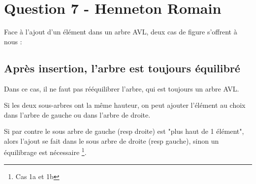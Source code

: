 \documentclass[10pt,a4paper]{article}
\begin{document}
\newpage
\section*{Question 7 - Henneton Romain}
Face à l'ajout d'un élément dans un arbre AVL, deux cas de figure s'offrent à nous :
\subsection*{Après insertion, l'arbre est toujours équilibré}
Dans ce cas, il ne faut pas rééquilibrer l'arbre, qui est toujours un arbre AVL. 

Si les deux sous-arbres ont la même hauteur, on peut ajouter l'élément au choix dans l'arbre de gauche ou dans l'arbre de droite.

Si par contre le sous arbre de gauche (resp droite) est "plus haut de 1 élément", alors l'ajout se fait dans le sous arbre de droite (resp gauche), sinon un équilibrage est nécessaire \footnote{Cas 1a et 1b}.
\end{document}
